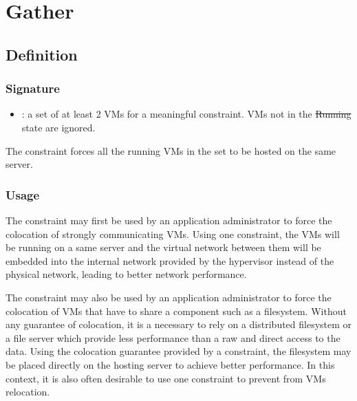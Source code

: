 \section{Gather}
\subsection{Definition}

\subsubsection{Signature} 

\begin{itemize}
\item {} : a set of at least 2 VMs for a meaningful constraint. VMs not in the \st{Running} state are ignored.
\end{itemize}

The  constraint forces all the running VMs in the set  to be hosted on the same server.


\subsubsection{Usage}

The  constraint may first be used by an application administrator to force the colocation of
 strongly communicating VMs.
Using one  constraint, the VMs will be running on a same server and the virtual network between them will be embedded into the internal network provided by the hypervisor instead of the physical network, leading to better network performance.

The  constraint may also be used by an application administrator to force the colocation
of VMs that have to share a component such as a filesystem. Without any guarantee of colocation, it is a necessary to rely on a distributed filesystem or a file server which provide less performance than a raw and direct access to the data. Using the colocation guarantee provided by a  constraint, the filesystem
may be placed directly on the hosting server to achieve better performance. In this context, it is also often
desirable to use one \hyperref[cstr: root]{} constraint to prevent from VMs relocation.

